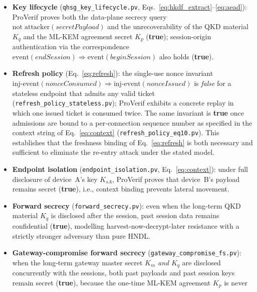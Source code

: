 \documentclass[journal]{IEEEtran}
\begin{document}
\begin{itemize}
  \item \textbf{Key lifecycle} (\texttt{qhsg\_key\_lifecycle.pv}, Eqs.~\eqref{eq:hkdf_extract}--\eqref{eq:aead}):
        ProVerif proves both the data-plane secrecy query
        $\mathrm{not}\;\mathrm{attacker}(\mathit{secretPayload})$ and the
        unrecoverability of the QKD material $K_q$ and the ML-KEM agreement secret
        $K_p$ (\textbf{true}); session-origin authentication via the correspondence
        $\mathrm{event}(\mathit{endSession}) \Longrightarrow
        \mathrm{event}(\mathit{beginSession})$ also holds (\textbf{true}).
  \item \textbf{Refresh policy} (Eq.~\eqref{eq:refresh}): the single-use nonce
        invariant $\mathrm{inj\text{-}event}(\mathit{nonceConsumed})
        \Longrightarrow \mathrm{inj\text{-}event}(\mathit{nonceIssued})$ is
        \emph{false} for a stateless endpoint that admits any valid ticket
        (\texttt{refresh\_policy\_stateless.pv}); ProVerif exhibits a concrete
        replay in which one issued ticket is consumed twice. The same invariant is
        \textbf{true} once admissions are bound to a per-connection sequence number
        as specified in the context string of Eq.~\eqref{eq:context}
        (\texttt{refresh\_policy\_eq10.pv}). This establishes that the freshness
        binding of Eq.~\eqref{eq:refresh} is both necessary and sufficient to
        eliminate the re-entry attack under the stated model.
  \item \textbf{Endpoint isolation} (\texttt{endpoint\_isolation.pv},
        Eq.~\eqref{eq:context}): under full disclosure of device~A's key $K_{sA}$,
        ProVerif proves that device~B's payload remains secret (\textbf{true}),
        i.e., context binding prevents lateral movement.
  \item \textbf{Forward secrecy} (\texttt{forward\_secrecy.pv}): even when the
        long-term QKD material $K_q$ is disclosed after the session, past session
        data remains confidential (\textbf{true}), modelling
        harvest-now-decrypt-later resistance with a strictly stronger adversary
        than pure HNDL.
  \item \textbf{Gateway-compromise forward secrecy}
        (\texttt{gateway\_compromise\_fs.pv}): when the long-term gateway master
        secret $K_m$ \emph{and} $K_q$ are disclosed concurrently with the
        sessions, both past payloads and past session keys remain secret
        (\textbf{true}), because the one-time ML-KEM agreement $K_p$ is never

\end{itemize}
\end{document}
